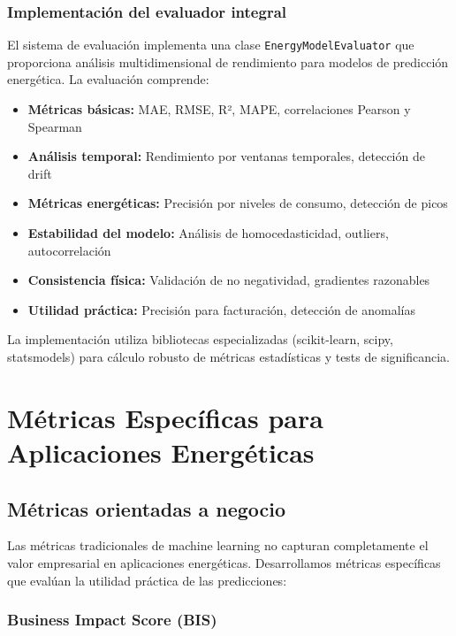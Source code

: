 \subsubsection{Implementación del evaluador integral}

El sistema de evaluación implementa una clase \texttt{EnergyModelEvaluator} que proporciona análisis multidimensional de rendimiento para modelos de predicción energética. La evaluación comprende:

\begin{itemize}
    \item \textbf{Métricas básicas:} MAE, RMSE, R², MAPE, correlaciones Pearson y Spearman
    \item \textbf{Análisis temporal:} Rendimiento por ventanas temporales, detección de drift
    \item \textbf{Métricas energéticas:} Precisión por niveles de consumo, detección de picos
    \item \textbf{Estabilidad del modelo:} Análisis de homocedasticidad, outliers, autocorrelación
    \item \textbf{Consistencia física:} Validación de no negatividad, gradientes razonables
    \item \textbf{Utilidad práctica:} Precisión para facturación, detección de anomalías
\end{itemize}

La implementación utiliza bibliotecas especializadas (scikit-learn, scipy, statsmodels) para cálculo robusto de métricas estadísticas y tests de significancia.

\section{Métricas Específicas para Aplicaciones Energéticas}

\subsection{Métricas orientadas a negocio}

Las métricas tradicionales de machine learning no capturan completamente el valor empresarial en aplicaciones energéticas. Desarrollamos métricas específicas que evalúan la utilidad práctica de las predicciones:

\subsubsection{Business Impact Score (BIS)}

